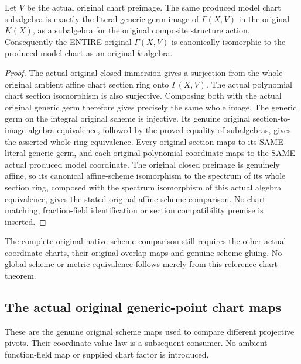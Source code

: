 \begin{theorem}
\label{thm:seven-original-produced-model-chart-sections-route}
\leanok
{}
Let $V$ be the actual original chart preimage. The same produced model
chart subalgebra is exactly the literal generic-germ image of
$\Gamma(X,V)$ in the original $K(X)$, as a subalgebra for the original
composite structure action. Consequently the ENTIRE original
$\Gamma(X,V)$ is canonically isomorphic to the produced model chart
as an original $k$-algebra.
\end{theorem}
\begin{proof}
The actual original closed immersion gives a surjection from the
whole original ambient affine chart section ring onto $\Gamma(X,V)$.
The actual polynomial chart section isomorphism is also surjective.
Composing both with the actual original generic germ therefore gives
precisely the same whole image. The generic germ on the integral
original scheme is injective. Its genuine original section-to-image
algebra equivalence, followed by the proved equality of subalgebras,
gives the asserted whole-ring equivalence. Every original section maps
to its SAME literal generic germ, and each original polynomial
coordinate maps to the SAME actual produced model coordinate.
The original closed preimage is genuinely affine, so its canonical
affine-scheme isomorphism to the spectrum of its whole section ring,
composed with the spectrum isomorphism of this actual algebra
equivalence, gives the stated original affine-scheme comparison.
No chart matching, fraction-field identification or section
compatibility premise is inserted.
\end{proof}

The complete original native-scheme comparison still requires the other
actual coordinate charts, their original overlap maps and genuine
scheme gluing. No global scheme or metric equivalence follows merely
from this reference-chart theorem.

\subsection{The actual original generic-point chart maps}
These are the genuine original scheme maps used to compare different
projective pivots. Their coordinate value law is a subsequent consumer.
No ambient function-field map or supplied chart factor is introduced.

